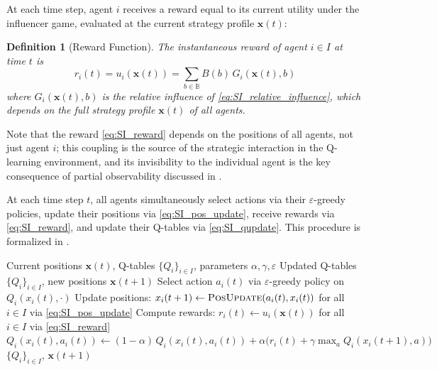 \documentclass{article}
\newtheorem{definition}{Definition}
\begin{document}
            At each time step, agent $i$ receives a reward equal to its current utility under the influencer game, evaluated at the current strategy profile $\mathbf{x}(t)$:

            \begin{definition}[Reward Function]\label{def:SI_reward}
                The instantaneous reward of agent $i \in I$ at time $t$ is
                \begin{equation}\label{eq:SI_reward}
                    r_i(t) = u_i(\mathbf{x}(t)) = \sum_{b \in \mathbb{B}} B(b)\,G_i(\mathbf{x}(t), b)
                \end{equation}
                where $G_i(\mathbf{x}(t), b)$ is the relative influence of \cref{eq:SI_relative_influence}, which depends on the full strategy profile $\mathbf{x}(t)$ of all agents.
            \end{definition}

            Note that the reward \cref{eq:SI_reward} depends on the positions of all agents, not just agent $i$; this coupling is the source of the strategic interaction in the Q-learning environment, and its invisibility to the individual agent is the key consequence of partial observability discussed in .

            At each time step $t$, all agents simultaneously select actions via their $\varepsilon$-greedy policies, update their positions via \cref{eq:SI_pos_update}, receive rewards via \cref{eq:SI_reward}, and update their Q-tables via \cref{eq:SI_qupdate}. This procedure is formalized in .

            \begin{algorithm}[ht!]
            \caption{Independent Q-Learning Step}
            \label{alg:SI_qstep}
            \begin{algorithmic}[1]
                \Require Current positions $\mathbf{x}(t)$,
                    Q-tables $\{Q_i\}_{i \in I}$,
                    parameters $\alpha, \gamma, \varepsilon$
                \Ensure Updated Q-tables $\{Q_i\}_{i \in I}$,
                    new positions $\mathbf{x}(t+1)$
                    \State Select action $a_i(t)$ via
                        $\varepsilon$-greedy policy on
                        $Q_i(x_i(t), \cdot)$
                \EndFor
                \State Update positions:
                    $x_i(t+1) \leftarrow
                    \textsc{PosUpdate}(a_i(t), x_i(t))$
                    for all $i \in I$ via \cref{eq:SI_pos_update}
                \State Compute rewards:
                    $r_i(t) \leftarrow u_i(\mathbf{x}(t))$
                    for all $i \in I$ via \cref{eq:SI_reward}
                    \State $Q_i(x_i(t), a_i(t)) \leftarrow
                        (1-\alpha)\,Q_i(x_i(t), a_i(t))
                        + \alpha\bigl(r_i(t) + \gamma
                        \max_{a} Q_i(x_i(t+1), a)\bigr)$
                \EndFor
                \State \Return $\{Q_i\}_{i \in I}$,
                    $\mathbf{x}(t+1)$
            \end{algorithmic}
            \end{algorithm}
\end{document}
